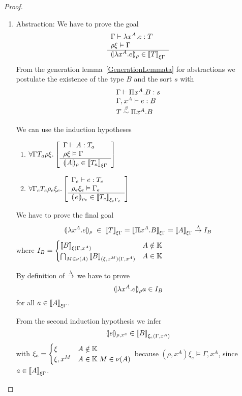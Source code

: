 \begin{theorem}
\begin{proof}
\begin{enumerate}
        \item Abstraction: We have to prove the goal
            $$
                \begin{array}{l}  \Gamma \vdash \lambda x^A.e : T \\ \rho \xi \vDash \Gamma  \\ \hline  {(\!|\lambda x^A.e|\!)_{\rho}} \in {{[\![}T{]\!]}}_{\xi\Gamma} \end{array}
            $$
            From the generation lemma~\ref{GenerationLemmata} for abstractions
            we postulate the existence of the type $B$ and the sort $s$ with
            $$
            \begin{array}{l}
                \Gamma \vdash \Pi x^A. B : s
                \\
                \Gamma,x^A \vdash e : B
                \\
                T \stackrel{\beta}{\sim} \Pi x^A. B
            \end{array}
            $$

            We can use the induction hypotheses
            \begin{enumerate}
            \item
                $\forall \Gamma T_a \rho \xi. \left[ \begin{array}{l}  \Gamma \vdash A : T_a \\ \rho \xi \vDash \Gamma  \\ \hline  {(\!|A|\!)_{\rho}} \in {{[\![}T_a{]\!]}}_{\xi\Gamma} \end{array} \right]$

            \item
                $\forall \Gamma_e T_e \rho_e \xi_e. \left[ \begin{array}{l}  \Gamma_e \vdash e : T_e \\ \rho_e \xi_e \vDash \Gamma_e  \\ \hline  {(\!|e|\!)_{\rho_e}} \in {{[\![}T_e{]\!]}}_{\xi_e\Gamma_e} \end{array} \right]$
            \end{enumerate}

            We have to prove the final goal
            $$
            \terminter{\lambda x^A. e}{\rho}
            \;\in\;
            \typeinter{T}{\xi\Gamma}
            = \typeinter{\Pi x^A.B}{\xi\Gamma}
            = \typeinter{A}{\xi\Gamma} \tolambda I_B
            $$
            where
            $
            I_B =
            \begin{cases}
                {{[\![}B{]\!]}}_{\xi(\Gamma,x^A)} & A \notin \mathbb{K}
                \\
                \bigcap_{M \in \nu(A)}
                {{[\![} B{]\!]}}_{(\xi,x^M)(\Gamma,x^A)} & A \in \mathbb{K}
            \end{cases}
            $

            By definition of $\stackrel{\lambda}{\to}$ we have to prove
            $$
            {(\!|\lambda x^A.e|\!)_{\rho}} a \in I_B
            $$
            for all $a \in {{[\![}A{]\!]}}_{\xi\Gamma}$.

            From the second induction hypothesis we infer
            $$
            {(\!|e|\!)_{\rho,x^a}} \in {{[\![}B{]\!]}}_{\xi_e(\Gamma,x^A)}
            $$
            with
            $\xi_e =
            \begin{cases}
                \xi & A \notin \mathbb{K}
                \\
                \xi,x^M & A \in \mathbb{K} \; M \in \nu(A)
            \end{cases}
            $ because $(\rho,x^A)\xi_e \vDash \Gamma, x^A$, since $a \in
            {{[\![}A{]\!]}}_{\xi\Gamma}$.


\end{enumerate}
\end{proof}
\end{theorem}
